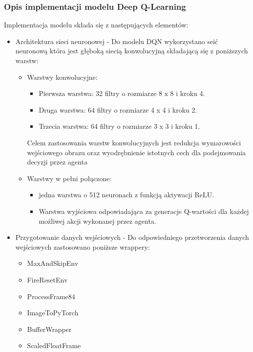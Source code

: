 \documentclass[a4paper, 12pt]{article}
\begin{document}
    \subsubsection{Opis implementacji modelu Deep Q-Learning}
    Implementacja modelu składa się z następujących elementów:
    \begin{itemize}
        \item Architektura sieci neuronowej - Do modelu DQN wykorzystano seić neuronową która jest głęboką siecią konwolucyjną składającą się z poniższych warstw:
        \begin{itemize}
            \item Warstwy konwolucyjne:
            \begin{itemize}
                \item Pierwsza warstwa: 32 filtry o rozmiarze 8 x 8 i kroku 4.
                \item Druga warstwa: 64 filtry o rozmiarze 4 x 4 i kroku 2.
                \item Trzecia warstwa: 64 filtry o rozmiarze 3 x 3 i kroku 1.
            \end{itemize}
            Celem zastosowania warstw konwolucyjnych jest redukcja wymarowości wejściowego obrazu oraz wyodrębnienie istotnych cech dla podejmowania decyzji przez agenta
            \item Warstwy w pełni połączone:
            \begin{itemize}
                \item jedna warstwa o 512 neuronach z funkcją aktywacji ReLU.
                \item Warstwa wyjściowa odpowiadająca za generacje Q-wartości dla każdej możliwej akcji wykonanej przez agenta.
            \end{itemize}
        \end{itemize}
        \item Przygotowanie danych wejściowych - Do odpowiedniego przetworzenia danych wejściowych zastosowano poniższe wrappery:
        \begin{itemize}
            \item MaxAndSkipEnv
            \item FireResetEnv
            \item ProcessFrame84
            \item ImageToPyTorch
            \item BufferWrapper
            \item ScaledFloatFrame
        \end{itemize}

\end{itemize}
\end{document}

